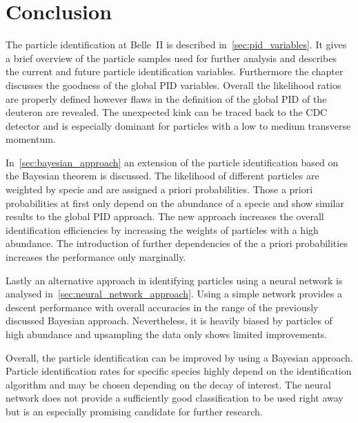 \chapter{Conclusion}
\label{chap:conclusion}

The particle identification at Belle~\RN{2} is described in~\autoref{sec:pid_variables}. It gives a brief overview of the particle samples used for further analysis and describes the current and future particle identification variables. Furthermore the chapter discusses the goodness of the global PID variables. Overall the likelihood ratios are properly defined however flaws in the definition of the global PID of the deuteron are revealed. The unexpected kink can be traced back to the CDC detector and is especially dominant for particles with a low to medium transverse momentum.

In~\autoref{sec:bayesian_approach} an extension of the particle identification based on the Bayesian theorem is discussed. The likelihood of different particles are weighted by specie and are assigned a priori probabilities. Those a priori probabilities at first only depend on the abundance of a specie and show similar results to the global PID approach. The new approach increases the overall identification efficiencies by increasing the weights of particles with a high abundance. The introduction of further dependencies of the a priori probabilities increases the performance only marginally.

Lastly an alternative approach in identifying particles using a neural network is analysed in~\autoref{sec:neural_network_approach}. Using a simple network provides a descent performance with overall accuracies in the range of the previously discussed Bayesian approach. Nevertheless, it is heavily biased by particles of high abundance and upsampling the data only shows limited improvements.

Overall, the particle identification can be improved by using a Bayesian approach. Particle identification rates for specific species highly depend on the identification algorithm and may be chosen depending on the decay of interest. The neural network does not provide a sufficiently good classification to be used right away but is an especially promising candidate for further research.
